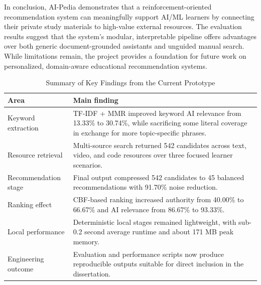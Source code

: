 \documentclass[10pt,journal,compsoc]{IEEEtran}
\begin{document}
In conclusion, AI-Pedia demonstrates that a reinforcement-oriented recommendation system can meaningfully support AI/ML learners by connecting their private study materials to high-value external resources. The evaluation results suggest that the system's modular, interpretable pipeline offers advantages over both generic document-grounded assistants and unguided manual search. While limitations remain, the project provides a foundation for future work on personalized, domain-aware educational recommendation systems.

\begin{table}[!t]
\renewcommand{\arraystretch}{1.25}
\caption{Summary of Key Findings from the Current Prototype}
\label{tab:key_findings_summary}
\centering
\footnotesize
\begin{tabular}{@{}p{2.1cm}p{5.0cm}@{}}
\hline\hline
Area & Main finding\\
\hline
Keyword extraction & TF-IDF + MMR improved keyword AI relevance from 13.33\% to 30.74\%, while sacrificing some literal coverage in exchange for more topic-specific phrases.\\
Resource retrieval & Multi-source search returned 542 candidates across text, video, and code resources over three focused learner scenarios.\\
Recommendation stage & Final output compressed 542 candidates to 45 balanced recommendations with 91.70\% noise reduction.\\
Ranking effect & CBF-based ranking increased authority from 40.00\% to 66.67\% and AI relevance from 86.67\% to 93.33\%.\\
Local performance & Deterministic local stages remained lightweight, with sub-0.2 second average runtime and about 171 MB peak memory.\\
Engineering outcome & Evaluation and performance scripts now produce reproducible outputs suitable for direct inclusion in the dissertation.\\
\hline\hline
\end{tabular}
\end{table}



\end{document}
